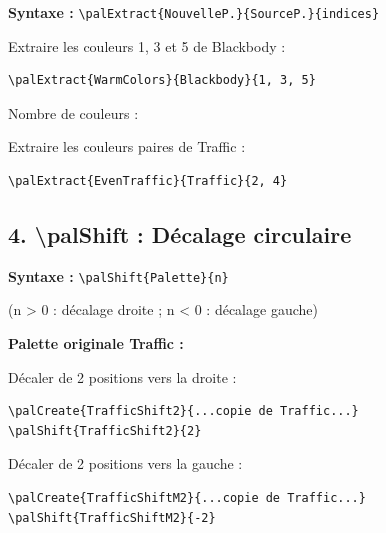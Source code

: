 \documentclass{article}
\begin{document}
\textbf{Syntaxe :} \texttt{\textbackslash palExtract\{NouvelleP.\}\{SourceP.\}\{indices\}}

\bigskip

Extraire les couleurs 1, 3 et 5 de Blackbody :
\begin{verbatim}
\palExtract{WarmColors}{Blackbody}{1, 3, 5}
\end{verbatim}


Nombre de couleurs : 

\bigskip
{}

\bigskip

Extraire les couleurs paires de Traffic :
\begin{verbatim}
\palExtract{EvenTraffic}{Traffic}{2, 4}
\end{verbatim}


\bigskip
{}

\subsection*{4. \textbackslash palShift : Décalage circulaire}

\textbf{Syntaxe :} \texttt{\textbackslash palShift\{Palette\}\{n\}}

\quad (n > 0 : décalage droite ; n < 0 : décalage gauche)

\bigskip

\textbf{Palette originale Traffic :}


\bigskip

Décaler de 2 positions vers la droite :
\begin{verbatim}
\palCreate{TrafficShift2}{...copie de Traffic...}
\palShift{TrafficShift2}{2}
\end{verbatim}



\bigskip

Décaler de 2 positions vers la gauche :
\begin{verbatim}
\palCreate{TrafficShiftM2}{...copie de Traffic...}
\palShift{TrafficShiftM2}{-2}
\end{verbatim}
\end{document}
